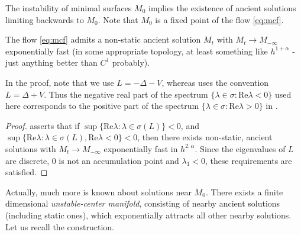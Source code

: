 \documentclass{amsart}
\begin{document}
The instability of minimal surfaces \(M_0\) implies the existence of ancient solutions limiting backwards to \(M_0\). Note that \(M_0\) is a fixed point of the flow \eqref{eq:mcf}.

\begin{thm}
\label{thm:ancient_existence}
The flow \eqref{eq:mcf} admits a non-static ancient solution \(M_t\) with \(M_t \to M_{-\infty}\) exponentially fast (in some appropriate topology, at least something like \(h^{1+\alpha}\) - just anything better than \(C^1\) probably).
\end{thm}

\begin{rem}
In the proof, note that we use \(L = -\Delta - V\), whereas \cite{lunardi2012analytic} uses the convention \(L = \Delta + V\). Thus the negative real part of the spectrum \(\{\lambda \in \sigma : \text{Re} \lambda < 0\}\) used here corresponds to the positive part of the spectrum \(\{\lambda \in \sigma : \text{Re} \lambda > 0\}\) in \cite{lunardi2012analytic}.
\end{rem}

\begin{proof}
\cite[Theorem 9.1.3]{lunardi2012analytic} asserts that if \(\sup \{\text{Re}\lambda : \lambda \in \sigma(L)\} < 0\), and \(\sup\{\text{Re} \lambda : \lambda \in \sigma(L), \text{Re} \lambda < 0\} < 0\), then there exists non-static, ancient solutions with \(M_t \to M_{-\infty}\) exponentially fast in \(h^{2,\alpha}\). Since the eigenvalues of \(L\) are discrete, \(0\) is not an accumulation point and \(\lambda_1 < 0\), these requirements are satisfied.
\end{proof}

Actually, much more is known about solutions near \(M_0\). There exists a finite dimensional \emph{unstable-center manifold}, consisting of nearby ancient solutions (including static ones), which exponentially attracts all other nearby solutions. Let us recall the construction.
\end{document}
